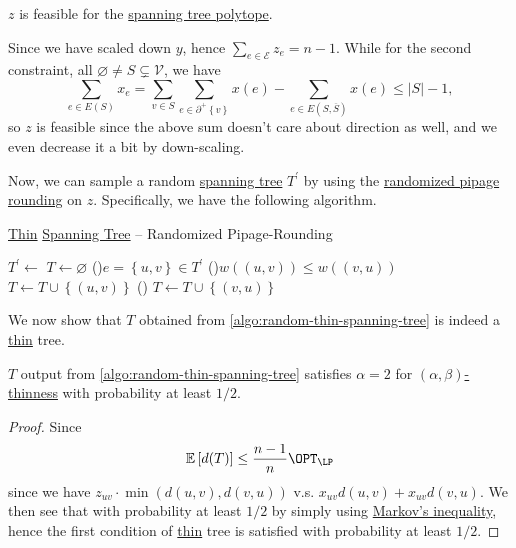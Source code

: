 \begin{remark}
	\(z\) is feasible for the \hyperref[eq:spanning-tree-polytope]{spanning tree polytope}.
\end{remark}
\begin{explanation}
	Since we have scaled down \(y\), hence \(\sum_{e\in \mathcal{E} } z_e = n-1\). While for the second constraint, all \(\varnothing \neq S \subsetneq \mathcal{V} \), we have
	\[
		\sum_{e\in E(S)} x_e = \sum_{v\in S} \sum_{e\in \partial ^+ \left\{ v \right\} } x(e) - \sum_{e\in E(S, \overline{S} )} x(e) \leq \left\vert S \right\vert - 1,
	\]
	so \(z\) is feasible since the above sum doesn't care about direction as well, and we even decrease it a bit by down-scaling.
\end{explanation}

Now, we can sample a random \hyperref[def:spanning-tree]{spanning tree} \(T^\prime \) by using the \hyperref[algo:min-spanning-tree-randomized-pipage-rounding]{randomized pipage rounding} on \(z\). Specifically, we have the following algorithm.

\begin{algorithm}[H]\label{algo:random-thin-spanning-tree}
	\DontPrintSemicolon
	\caption{\hyperref[def:thin]{Thin} \hyperref[def:spanning-tree]{Spanning Tree} -- Randomized Pipage-Rounding}
	\BlankLine
	\(T^\prime \gets\)\;
	\(T\gets \varnothing \)\;
	\For(){\(e=\left\{ u, v \right\} \in T^\prime \)}{
		\uIf(){\(w((u, v)) \leq w((v, u))\)}{
			\(T\gets T \cup \left\{ (u, v) \right\} \)\;
		}
		\Else(){
			\(T\gets T \cup \left\{ (v, u) \right\} \)\;
		}
	}
	\;
\end{algorithm}

We now show that \(T\) obtained from \autoref{algo:random-thin-spanning-tree} is indeed a \hyperref[def:thin]{thin} tree.

\begin{lemma}\label{lma:lec12-1}
	\(T\) output from \autoref{algo:random-thin-spanning-tree} satisfies \(\alpha =2\) for \hyperref[def:thin]{\((\alpha , \beta )\)-thinness} with probability at least \(1/2\).
\end{lemma}
\begin{proof}
	Since
	\[
		\mathbb{E}\left[d(T) \right] \leq \frac{n-1}{n}\OPT_{\LP }
	\]
	since we have \(z_{uv}\cdot \min (d(u, v), d(v, u))\) v.s. \(x_{uv} d(u, v) + x_{uv} d(v, u)\). We then see that with probability at least \(1 / 2\) by simply using \href{https://en.wikipedia.org/wiki/Markov%27s_inequality}{Markov's inequality}, hence the first condition of \hyperref[def:thin]{thin} tree is satisfied with probability at least \(1 / 2\).
\end{proof}

